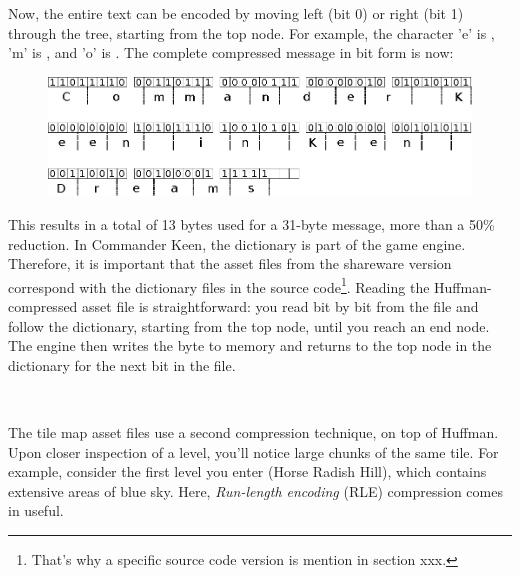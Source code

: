 \documentclass[book.tex]{subfiles}
\begin{document}
 \par
Now, the entire text can be encoded by moving left (bit 0) or right (bit 1) through the tree, starting from the top node. For example, the character 'e' is , 'm' is , and 'o' is . The complete compressed message in bit form is now:\\


\begin{figure}[H]
\centering
 \includegraphics[width=\textwidth]{imgs/drawings/huffman_decode.eps}
 \end{figure}

 \par
This results in a total of 13 bytes used for a 31-byte message, more than a 50\% reduction. In Commander Keen, the dictionary is part of the game engine. Therefore, it is important that the asset files from the shareware version correspond with the dictionary files in the source code\footnote{That's why a specific source code version is mention in section xxx.}. Reading the Huffman-compressed asset file is straightforward: you read bit by bit from the file and follow the dictionary, starting from the top node, until you reach an end node. The engine then writes the byte to memory and returns to the top node in the dictionary for the next bit in the file.\\

\par
\begin{minipage}{\textwidth}
 \par
 \end{minipage}\\

\par
The tile map asset files use a second compression technique, on top of Huffman. Upon closer inspection of a level, you'll notice large chunks of the same tile. For example, consider the first level you enter (Horse Radish Hill), which contains extensive areas of blue sky. Here, \textit{Run-length encoding} (RLE) compression comes in useful.\\
\end{document}
